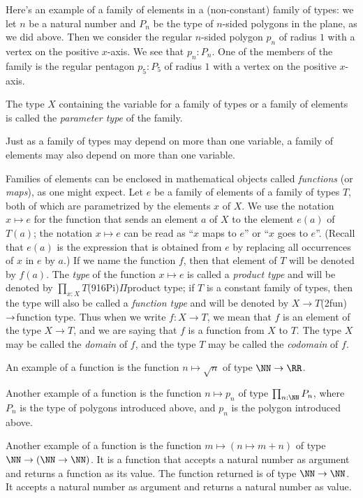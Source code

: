 Here's an example of a family of elements in a (non-constant) family of types: we let $n$ be a natural number and $P_n$ be the type of $n$-sided
polygons in the plane, as we did above.  Then we consider the regular $n$-sided polygon $p_n$ of radius $1$ with a vertex on the positive $x$-axis.  We
see that $p_n : P_n$.  One of the members of the family is the regular pentagon $p_5 : P_5$ of radius $1$ with a vertex on the positive $x$-axis.

The type $X$ containing the variable for a family of types or a family of elements is called the \emph{parameter type} of
the family. 

Just as a family of types may depend on more than one variable, a family of elements may also depend on more than one variable.

Families of elements can be enclosed in mathematical objects called \emph{functions} (or \emph{maps}), as one might
expect.
Let $e$ be a family of elements of a family of types $T$,
both of which are parametrized by the elements $x$ of $X$.  We use the notation $x \mapsto e$ for the function that sends an element $a$ of $X$
to the element $e(a)$ of $T(a)$; the notation $x \mapsto e$ can be read as ``$x$ maps to $e$'' or ``$x$ goes to $e$''.  (Recall that $e(a)$ is
the expression that is obtained from $e$ by replacing all occurrences of $x$ in $e$ by $a$.)  If we name the function $f$, then that element of
$T$ will be denoted by $f(a)$.  The \emph{type} of the function $x \mapsto e$ is called a \emph{product type} and will be denoted by
$\prod_{x:X} T$\glossary(916Pi){$\Pi$}{product type}; if $T$ is a constant family of types, then the type will also be
called a \emph{function type} and will be denoted by $X \to T$\glossary(2fun){$\protect\to$}{function type}.  Thus when we write $f : X \to T$,
we mean that $f$ is an element of the type $X \to T$, and we are saying that $f$ is a function from $X$ to $T$.  The type $X$ may be called the
\emph{domain} of $f$, and the type $T$ may be called the \emph{codomain} of $f$.

An example of a function is the function $n \mapsto \sqrt n$ of type $\NN \to \RR$.

Another example of a function is the function $n \mapsto p_n$ of type $\prod_{n:\NN} P_n$, where $P_n$ is the type of polygons introduced above,
and $p_n$ is the polygon introduced above.

Another example of a function is the function $m \mapsto (n \mapsto m+n)$ of type $\NN \to (\NN \to \NN)$.  It is a function that accepts a
natural number as argument and returns a function as its value.  The function returned is of type $\NN \to \NN$.  It accepts a natural number
as argument and returns a natural number as value.

